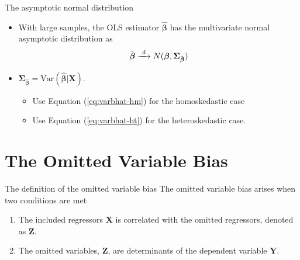 \documentclass[presentation,10pt]{beamer}
\newcommand{\var}{\mathrm{Var}}
\newcommand{\rarrowd}[1]{\xrightarrow{\text{ \textit #1 }}}
\begin{document}
\begin{frame}[label={sec:org34c3001}]{The asymptotic normal distribution}
\begin{itemize}
\item With large samples, the OLS estimator \(\hat{\boldsymbol{\beta}}\) has the
multivariate normal asymptotic distribution as
\begin{equation}
\label{eq:normal-bhat-m}
\hat{\boldsymbol{\beta}} \rarrowd{d} N(\boldsymbol{\beta}, \boldsymbol{\Sigma_{\hat{\boldsymbol{\beta}}}})
\end{equation}

\item \(\boldsymbol{\Sigma_{\hat{\boldsymbol{\beta}}}} =
  \var(\hat{\boldsymbol{\beta}} | \mathbf{X})\).
\begin{itemize}
\item Use Equation (\ref{eq:varbhat-hm}) for the homoskedastic case
\item Use Equation (\ref{eq:varbhat-ht}) for the heteroskedastic case.
\end{itemize}
\end{itemize}
\end{frame}

\section{The Omitted Variable Bias}
\label{sec:orgdd599b3}
\setcounter{tocdepth}{1}
\tableofcontents[currentsection]
\begin{frame}[label={sec:org5aa4825}]{The definition of the omitted variable bias}
The \alert{omitted variable bias} arises when two conditions are met
\begin{enumerate}
\item The included regressors \(\mathbf{X}\) is correlated with the
omitted regressors, denoted as \(\mathbf{Z}\).
\item The omitted variables, \(\mathbf{Z}\), are determinants of the
dependent variable \(\mathbf{Y}\).
\end{enumerate}
\end{frame}
\end{document}
